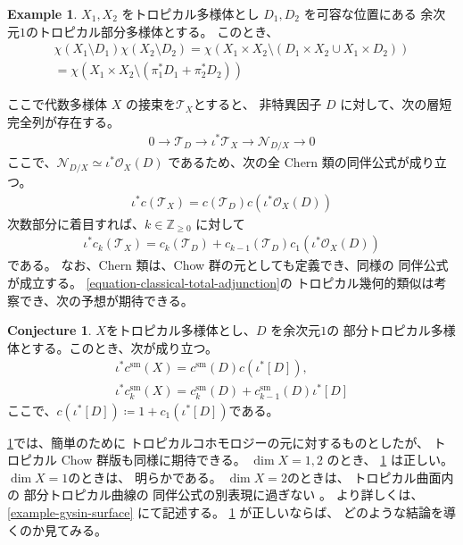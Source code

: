 \documentclass[a4paper,dvipdfmx,reqno,12pt]{amsart}
\theoremstyle{definition}
\newtheorem{example}[theorem]{Example}
\newtheorem{conjecture}[theorem]{Conjecture}
\newcommand{\deq}{\coloneqq}
\numberwithin{equation}{section}
\begin{document}
\begin{example}
$X_1,X_2$ をトロピカル多様体とし 
$D_1,D_2$ を可容な位置にある
余次元$1$のトロピカル部分多様体とする。
このとき、
\begin{align}
\chi(X_1\setminus D_1)\chi(X_2\setminus D_2)
=\chi(X_1\times X_2 \setminus (D_1\times X_2\cup X_1\times D_2)) \\
=\chi(X_1\times X_2 \setminus (\pi_1^{*}D_1+\pi_2^{*}D_2))
\end{align}

\end{example}

ここで代数多様体 $X$ の接束を$\mathcal{T}_X$とすると、
非特異因子 $D$ に対して、次の層短完全列が存在する。
\begin{align}
0 \to \mathcal{T}_{D}\to \iota^{*}\mathcal{T}_X
\to \mathcal{N}_{D/X}\to 0
\end{align}
ここで、$\mathcal{N}_{D/X}\simeq \iota^{*}\mathcal{O}_X(D)$
であるため、次の全 Chern 類の同伴公式が成り立つ。
\begin{align}
\label{equation-classical-total-adjunction}
\iota^{*}c(\mathcal{T}_X)
=c(\mathcal{T}_{D})c(\iota^{*}\mathcal{O}_X(D))
\end{align}
次数部分に着目すれば、$k\in \mathbb{Z}_{\geq 0}$
に対して
\begin{align}
\label{equation-classical-total-adjunction}
\iota^{*}c_k(\mathcal{T}_X)
=c_{k}(\mathcal{T}_{D})+
c_{k-1}(\mathcal{T}_{D})c_1(\iota^{*}\mathcal{O}_X(D))
\end{align}
である。
なお、Chern 類は、Chow 群の元としても定義でき、同様の
同伴公式が成立する。
\eqref{equation-classical-total-adjunction}の
トロピカル幾何的類似は考察でき、次の予想が期待できる。
\begin{conjecture}
\label{conjecture-grr-divisor}
$X$をトロピカル多様体とし、$D$ を余次元$1$の
部分トロピカル多様体とする。このとき、次が成り立つ。
\begin{align}
\label{equation-total-adjunction}
\iota^{*}c^{\mathrm{sm}}(X)=c^{\mathrm{sm}}(D)c(\iota^{*}[D]), \\ 
\iota^{*}c^{\mathrm{sm}}_k(X)=c^{\mathrm{sm}}_k(D)+c^{\mathrm{sm}}_{k-1}(D)\iota^{*}[D]
\end{align}
ここで、$c(\iota^{*}[D])\deq 1+c_1(\iota^{*}[D])$である。 
\end{conjecture}
\cref{conjecture-grr-divisor}では、簡単のために
トロピカルコホモロジーの元に対するものとしたが、
トロピカル Chow 群版も同様に期待できる。
$\dim X=1,2$ のとき、
\cref{conjecture-grr-divisor}
は正しい。$\dim X=1$のときは、
明らかである。
$\dim X=2$のときは、
トロピカル曲面内の
部分トロピカル曲線の
同伴公式の別表現に過ぎない
\cite[Theorem 6]{shaw2015tropical}。
より詳しくは、\cref{example-gysin-surface}
にて記述する。
\cref{conjecture-grr-divisor} 
が正しいならば、
どのような結論を導くのか見てみる。
\end{document}
